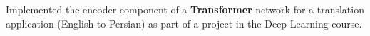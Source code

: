 \item{Implemented the encoder component of a \textbf{Transformer} network for a translation application (English to Persian) as part of a project in the Deep Learning course.}

